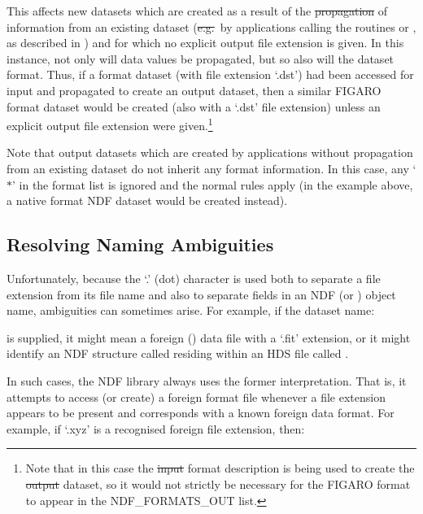 This affects new datasets which are created as a result of the
\st{propagation} of information from an existing dataset
(\st{e.g.}\ by applications calling the routines
 or
, as described in
) and for which no explicit
output file extension is given. In this instance, not only will data
values be propagated, but so also will the dataset format.  Thus, if a
 format dataset (with file extension `.dst') had
been accessed for input and propagated to create an output dataset,
then a similar FIGARO format dataset would be created (also with a
`.dst' file extension) unless an explicit output file extension were
given.\footnote{Note that in this case the \st{input} format
description is being used to create the \st{output} dataset, so it
would not strictly be necessary for the FIGARO format to appear in the
NDF\_FORMATS\_OUT list.}

Note that output datasets which are created by applications
without propagation from an existing dataset do not inherit any format
information. In this case, any `$*$' in the format list is ignored and
the normal rules apply (in the example above, a native format NDF
dataset would be created instead).

\subsection{Resolving Naming Ambiguities}

Unfortunately, because the `.' (dot) character is used both to
separate a file extension from its file name and also to separate
fields in an NDF (or ) object name, ambiguities can
sometimes arise. For example, if the dataset name:

\begin{quote}
\end{quote}

is supplied, it might mean a foreign
() data file with a `.fit'
extension, or it might identify an NDF structure called 
residing within an HDS file called .

In such cases, the NDF library always uses the former
interpretation. That is, it attempts to access (or create) a foreign
format file whenever a file extension appears to be present and
corresponds with a known foreign data format. For example, if `.xyz'
is a recognised foreign file extension, then:

